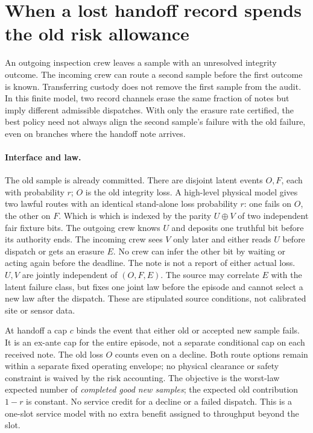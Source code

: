 \documentclass[11pt]{article}
\begin{document}
\section*{When a lost handoff record spends the old risk allowance}

An outgoing inspection crew leaves a sample with an unresolved integrity outcome. The incoming crew can route a second sample before the first outcome is known. Transferring custody does not remove the first sample from the audit. In this finite model, two record channels erase the same fraction of notes but imply different admissible dispatches. With only the erasure rate certified, the best policy need not always align the second sample's failure with the old failure, even on branches where the handoff note arrives.

\paragraph{Interface and law.}
The old sample is already committed. There are disjoint latent events $O,F$, each with probability $r$; $O$ is the old integrity loss. A high-level physical model gives two lawful routes with an identical stand-alone loss probability $r$: one fails on $O$, the other on $F$. Which is which is indexed by the parity $U\oplus V$ of two independent fair fixture bits. The outgoing crew knows $U$ and deposits one truthful bit before its authority ends. The incoming crew sees $V$ only later and either reads $U$ before dispatch or gets an erasure $E$. No crew can infer the other bit by waiting or acting again before the deadline. The note is not a report of either actual loss. $U,V$ are jointly independent of $(O,F,E)$. The source may correlate $E$ with the latent failure class, but fixes one joint law before the episode and cannot select a new law after the dispatch. These are stipulated source conditions, not calibrated site or sensor data.

At handoff a cap $c$ binds the event that either old or accepted new sample fails. It is an ex-ante cap for the entire episode, not a separate conditional cap on each received note. The old loss $O$ counts even on a decline. Both route options remain within a separate fixed operating envelope; no physical clearance or safety constraint is waived by the risk accounting. The objective is the worst-law expected number of \emph{completed good new samples}; the expected old contribution $1-r$ is constant. No service credit for a decline or a failed dispatch. This is a one-slot service model with no extra benefit assigned to throughput beyond the slot.
\end{document}

